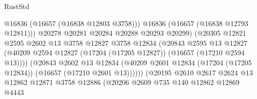 \begin{lexlean}{RustStd}
\begin{coremodule}
                                            @16836
                                            (@16657 (@16838 @12803 @3758)))
                                          @16836
                                          (@16657 (@16838 @12793 @12811)))
                                        @20278
                                        @20281
                                        @20284
                                        @20288
                                        @20293
                                        @20299)
                                      (@20305
                                        @12821
                                        @2595
                                        @2602
                                        @13
                                        @3758
                                        @12827
                                        @3758
                                        @12834
                                        (@20843
                                          @2595
                                          @13
                                          @12827
                                          (@40209
                                            @2594
                                            @12827
                                            (@17204 (@17205 @12827))
                                            (@16657 (@17210 @2594 @13))))
                                        (@20843
                                          @2602
                                          @13
                                          @12834
                                          (@40209
                                            @2601
                                            @12834
                                            (@17204 (@17205 @12834))
                                            (@16657 (@17210 @2601 @13))))))
                                    (@20195
                                      @2610
                                      @2617
                                      @2624
                                      @13
                                      @12862
                                      @12871
                                      @3758
                                      @12886
                                      (@20206
                                        @2609
                                        @735
                                        @140
                                        @12862
                                        @12869
                                        @4443

\end{coremodule}
\end{lexlean}
